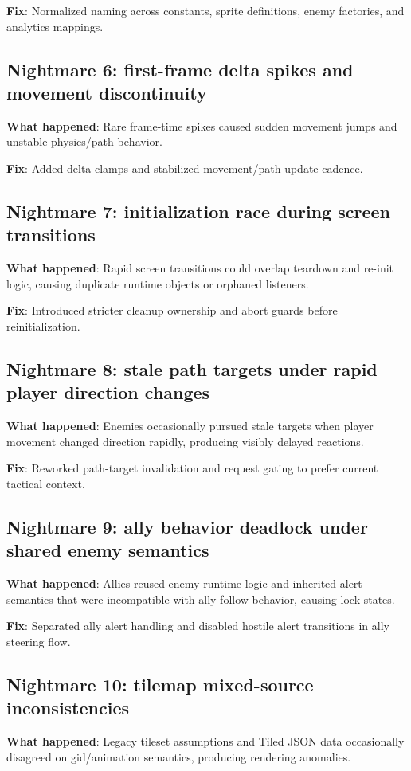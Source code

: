 \documentclass[11pt,a4paper,twoside]{article}
\begin{document}
\textbf{Fix}: Normalized naming across constants, sprite definitions, enemy factories, and analytics mappings.

\subsection{Nightmare 6: first-frame delta spikes and movement discontinuity}
\textbf{What happened}: Rare frame-time spikes caused sudden movement jumps and unstable physics/path behavior.

\textbf{Fix}: Added delta clamps and stabilized movement/path update cadence.

\subsection{Nightmare 7: initialization race during screen transitions}
\textbf{What happened}: Rapid screen transitions could overlap teardown and re-init logic, causing duplicate runtime objects or orphaned listeners.

\textbf{Fix}: Introduced stricter cleanup ownership and abort guards before reinitialization.

\subsection{Nightmare 8: stale path targets under rapid player direction changes}
\textbf{What happened}: Enemies occasionally pursued stale targets when player movement changed direction rapidly, producing visibly delayed reactions.

\textbf{Fix}: Reworked path-target invalidation and request gating to prefer current tactical context.

\subsection{Nightmare 9: ally behavior deadlock under shared enemy semantics}
\textbf{What happened}: Allies reused enemy runtime logic and inherited alert semantics that were incompatible with ally-follow behavior, causing lock states.

\textbf{Fix}: Separated ally alert handling and disabled hostile alert transitions in ally steering flow.

\subsection{Nightmare 10: tilemap mixed-source inconsistencies}
\textbf{What happened}: Legacy tileset assumptions and Tiled JSON data occasionally disagreed on gid/animation semantics, producing rendering anomalies.
\end{document}
